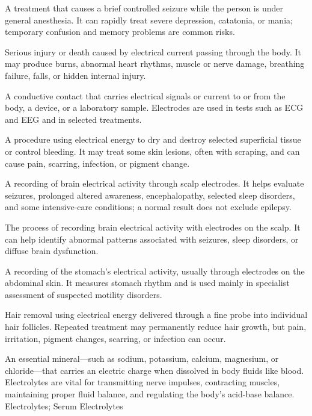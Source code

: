  A treatment that causes a brief controlled seizure while the person is under general anesthesia. It can rapidly treat severe depression, catatonia, or mania; temporary confusion and memory problems are common risks.

 Serious injury or death caused by electrical current passing through the body. It may produce burns, abnormal heart rhythms, muscle or nerve damage, breathing failure, falls, or hidden internal injury.

 A conductive contact that carries electrical signals or current to or from the body, a device, or a laboratory sample. Electrodes are used in tests such as ECG and EEG and in selected treatments.

 A procedure using electrical energy to dry and destroy selected superficial tissue or control bleeding. It may treat some skin lesions, often with scraping, and can cause pain, scarring, infection, or pigment change.

 A recording of brain electrical activity through scalp electrodes. It helps evaluate seizures, prolonged altered awareness, encephalopathy, selected sleep disorders, and some intensive-care conditions; a normal result does not exclude epilepsy.

 The process of recording brain electrical activity with electrodes on the scalp. It can help identify abnormal patterns associated with seizures, sleep disorders, or diffuse brain dysfunction.

 A recording of the stomach’s electrical activity, usually through electrodes on the abdominal skin. It measures stomach rhythm and is used mainly in specialist assessment of suspected motility disorders.

 Hair removal using electrical energy delivered through a fine probe into individual hair follicles. Repeated treatment may permanently reduce hair growth, but pain, irritation, pigment changes, scarring, or infection can occur.

 An essential mineral---such as sodium, potassium, calcium, magnesium, or chloride---that carries an electric charge when dissolved in body fluids like blood. Electrolytes are vital for transmitting nerve impulses, contracting muscles, maintaining proper fluid balance, and regulating the body's acid-base balance.
\synonyms
Electrolytes; Serum Electrolytes

